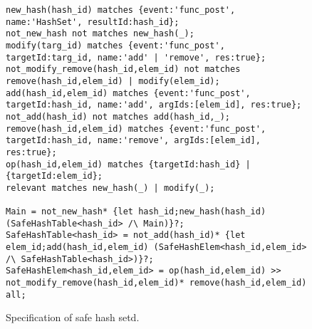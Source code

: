 
\begin{figure}[h]
\begin{lstlisting}[basicstyle=\ttfamily\scriptsize]
new_hash(hash_id) matches {event:'func_post', name:'HashSet', resultId:hash_id};
not_new_hash not matches new_hash(_);
modify(targ_id) matches {event:'func_post', targetId:targ_id, name:'add' | 'remove', res:true};
not_modify_remove(hash_id,elem_id) not matches remove(hash_id,elem_id) | modify(elem_id);
add(hash_id,elem_id) matches {event:'func_post', targetId:hash_id, name:'add', argIds:[elem_id], res:true};
not_add(hash_id) not matches add(hash_id,_);
remove(hash_id,elem_id) matches {event:'func_post', targetId:hash_id, name:'remove', argIds:[elem_id], res:true};
op(hash_id,elem_id) matches {targetId:hash_id} | {targetId:elem_id};
relevant matches new_hash(_) | modify(_);

Main = not_new_hash* {let hash_id;new_hash(hash_id) (SafeHashTable<hash_id> /\ Main)}?;
SafeHashTable<hash_id> = not_add(hash_id)* {let elem_id;add(hash_id,elem_id) (SafeHashElem<hash_id,elem_id> /\ SafeHashTable<hash_id>)}?;
SafeHashElem<hash_id,elem_id> = op(hash_id,elem_id) >> not_modify_remove(hash_id,elem_id)* remove(hash_id,elem_id) all;
\end{lstlisting}
\caption{Specification of safe hash setd.}\label{list:hash}
\end{figure}

